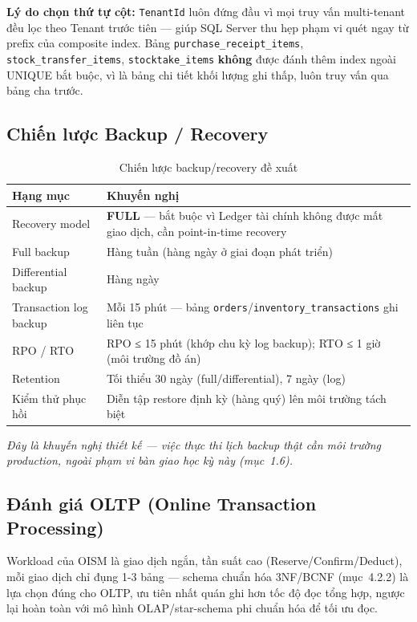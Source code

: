 \textbf{Lý do chọn thứ tự cột:} \texttt{TenantId} luôn đứng đầu vì mọi truy vấn multi-tenant đều lọc theo Tenant trước tiên — giúp SQL Server thu hẹp phạm vi quét ngay từ prefix của composite index. Bảng \texttt{purchase\_receipt\_items}, \texttt{stock\_transfer\_items}, \texttt{stocktake\_items} \textbf{không} được đánh thêm index ngoài UNIQUE bắt buộc, vì là bảng chi tiết khối lượng ghi thấp, luôn truy vấn qua bảng cha trước.

\subsection{Chiến lược Backup / Recovery}
\begin{table}[htbp]
    \centering
    \small
    \caption{Chiến lược backup/recovery đề xuất}
    \begin{tabularx}{\textwidth}{|p{3.2cm}|Y|}
        \hline
        \textbf{Hạng mục} & \textbf{Khuyến nghị} \\
        \hline
        Recovery model & \textbf{FULL} — bắt buộc vì Ledger tài chính không được mất giao dịch, cần point-in-time recovery \\
        \hline
        Full backup & Hàng tuần (hàng ngày ở giai đoạn phát triển) \\
        \hline
        Differential backup & Hàng ngày \\
        \hline
        Transaction log backup & Mỗi 15 phút — bảng \texttt{orders}/\texttt{inventory\_transactions} ghi liên tục \\
        \hline
        RPO / RTO & RPO ≤ 15 phút (khớp chu kỳ log backup); RTO ≤ 1 giờ (môi trường đồ án) \\
        \hline
        Retention & Tối thiểu 30 ngày (full/differential), 7 ngày (log) \\
        \hline
        Kiểm thử phục hồi & Diễn tập restore định kỳ (hàng quý) lên môi trường tách biệt \\
        \hline
    \end{tabularx}
\end{table}
\textit{Đây là khuyến nghị thiết kế — việc thực thi lịch backup thật cần môi trường production, ngoài phạm vi bàn giao học kỳ này (mục~1.6).}

\subsection{Đánh giá OLTP (Online Transaction Processing)}
Workload của OISM là giao dịch ngắn, tần suất cao (Reserve/Confirm/Deduct), mỗi giao dịch chỉ đụng 1-3 bảng — schema chuẩn hóa 3NF/BCNF (mục~4.2.2) là lựa chọn đúng cho OLTP, ưu tiên nhất quán ghi hơn tốc độ đọc tổng hợp, ngược lại hoàn toàn với mô hình OLAP/star-schema phi chuẩn hóa để tối ưu đọc.

